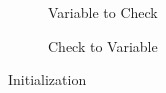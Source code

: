 \documentclass{article}
\begin{document}
\begin{figure}[ht]
    \centering
    \begin{subfigure}{0.475\textwidth}
        \centering
        \resizebox{\textwidth}{!}{}
        \caption{Variable to Check}
    \end{subfigure}
    \hfill
    \begin{subfigure}{0.475\textwidth}
        \centering
        \resizebox{\textwidth}{!}{}
        \caption{Check to Variable}
    \end{subfigure}
    
    \vspace{0.5cm}
    \caption{Initialization}
\end{figure}
\end{document}
